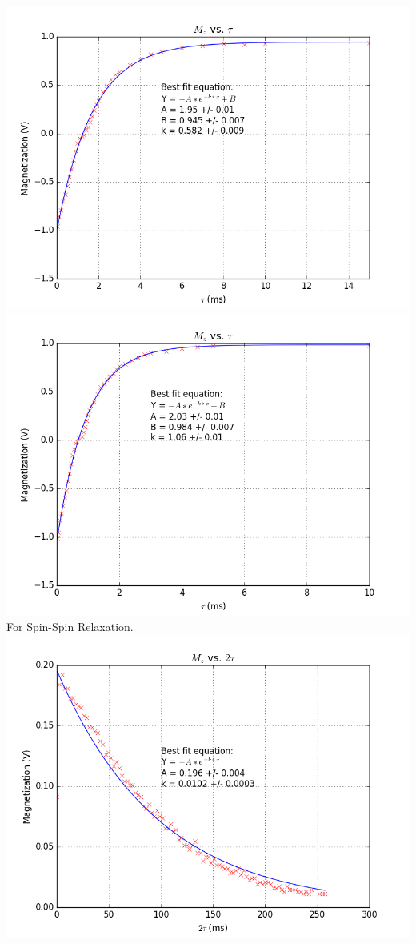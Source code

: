 \documentclass{article}
\begin{document}
{\begin{multicols}{2}
\label{fig:24}
\includegraphics[width=\linewidth]{pic-for-report/a0500M-CuSO4-T1-inset.png}
\label{fig:25}
\includegraphics[width=\linewidth]{pic-for-report/a1000M-CuSO4-T1-inset.png}
\label{fig:26}
\justify
For Spin-Spin Relaxation.
\includegraphics[width=\linewidth]{pic-for-report/a0005M-CuSO4-T2-MG.png}

\end{multicols}}
\end{document}
